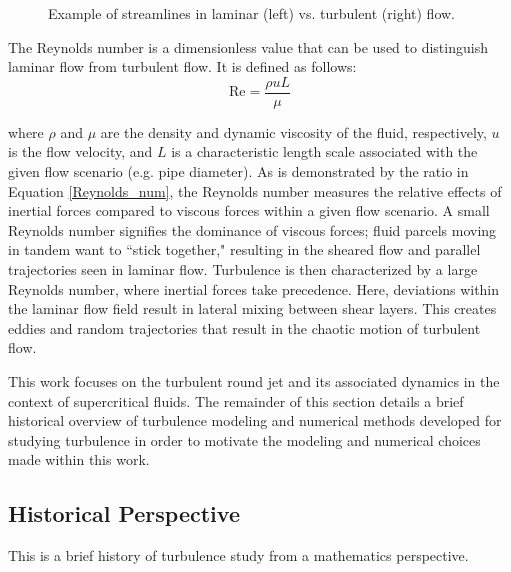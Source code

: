 \begin{figure}[h!]
\begin{center}
\end{center}
\caption{Example of streamlines in laminar (left) vs. turbulent (right) flow.}
\label{lam_vs_turb}
\end{figure}

The Reynolds number is a dimensionless value that can be used to distinguish laminar flow from turbulent flow. It is defined as follows:
\begin{equation}
\label{Reynolds_num}
\text{Re} = \frac{\rho u L}{\mu}
\end{equation}

\noindent where $\rho$ and $\mu$ are the density and dynamic viscosity of the fluid, respectively, $u$ is the flow velocity, and $L$ is a characteristic length scale associated with the given flow scenario (e.g. pipe diameter). As is demonstrated by the ratio in Equation \ref{Reynolds_num}, the Reynolds number measures the relative effects of inertial forces compared to viscous forces within a given flow scenario. A small Reynolds number signifies the dominance of viscous forces; fluid parcels moving in tandem want to ``stick together," resulting in the sheared flow and parallel trajectories seen in laminar flow. Turbulence is then characterized by a large Reynolds number, where inertial forces take precedence. Here, deviations within the laminar flow field result in lateral mixing between shear layers. This creates eddies and random trajectories that result in the chaotic motion of turbulent flow. 

This work focuses on the turbulent round jet and its associated dynamics in the context of supercritical fluids. The remainder of this section details a brief historical overview of turbulence modeling and numerical methods developed for studying turbulence in order to motivate the modeling and numerical choices made within this work.

\subsection{Historical Perspective}
This is a brief history of turbulence study from a mathematics perspective.


